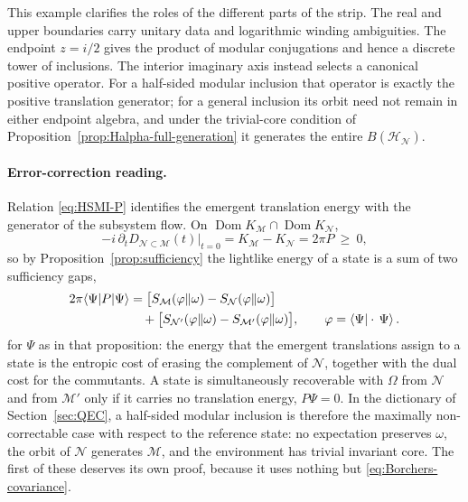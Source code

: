 \documentclass[a4paper,11pt]{article}
\theoremstyle{definition}
\newcommand{\mN}{\mathcal{N}}
\newcommand{\mH}{\mathcal{H}}
\newcommand{\mM}{\mathcal{M}}
\begin{document}
This example clarifies the roles of the different parts of the strip. The
real and upper boundaries carry unitary data and logarithmic winding
ambiguities. The endpoint $z=i/2$ gives the product of modular conjugations
and hence a discrete tower of inclusions. The interior imaginary axis instead
selects a canonical positive operator. For a half-sided modular inclusion
that operator is exactly the positive translation generator; for a general
inclusion its orbit need not remain in either endpoint algebra, and under the
trivial-core condition of
Proposition~\ref{prop:Halpha-full-generation} it generates the entire
$B(\mH_{\mN})$.


\paragraph{Error-correction reading.}
Relation \eqref{eq:HSMI-P} identifies the emergent translation energy with the generator of the subsystem flow. On $\operatorname{Dom}K_{\mM}\cap\operatorname{Dom}K_{\mN}$,
\begin{equation}
 -i\,\partial_t D_{\mN\subset\mM}(t)\big|_{t=0}=K_{\mM}-K_{\mN}=2\pi P\ \ge\ 0 ,
 \label{eq:HSMI-generator}
\end{equation}
so by Proposition~\ref{prop:sufficiency} the lightlike energy of a state is a sum of two sufficiency gaps,
\begin{equation}
 \begin{aligned}
 2\pi\langle\Psi|P|\Psi\rangle
 &=\bigl[S_{\mM}(\varphi\|\omega)-S_{\mN}(\varphi\|\omega)\bigr]\\
 &\quad+\bigl[S_{\mN'}(\varphi\|\omega)-S_{\mM'}(\varphi\|\omega)\bigr],
 \qquad \varphi=\braket{\Psi|\cdot\,\Psi}.
 \end{aligned}
 \label{eq:HSMI-energy-gaps}
\end{equation}
for $\Psi$ as in that proposition: the energy that the emergent translations assign to a state is the entropic cost of erasing the complement of $\mN$, together with the dual cost for the commutants. A state is simultaneously recoverable with $\Omega$ from $\mN$ and from $\mM'$ only if it carries no translation energy, $P\Psi=0$. In the dictionary of Section~\ref{sec:QEC}, a half-sided modular inclusion is therefore the maximally non-correctable case with respect to the reference state: no expectation preserves $\omega$, the orbit of $\mN$ generates $\mM$, and the environment has trivial invariant core. The first of these deserves its own proof, because it uses nothing but \eqref{eq:Borchers-covariance}.
\end{document}
